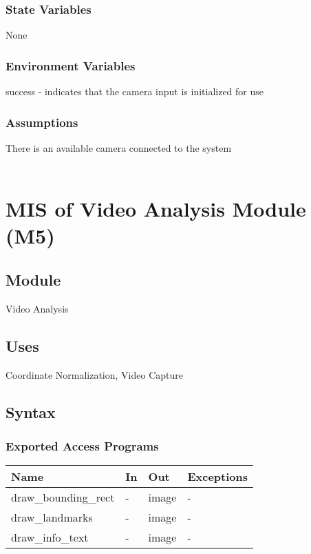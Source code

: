 \documentclass[12pt, titlepage]{article}
\begin{document}
\subsubsection{State Variables}

None\\

\subsubsection{Environment Variables}

success - indicates that the camera input is initialized for use\\

\subsubsection{Assumptions}

There is an available camera connected to the system\\

\newpage
~\newpage

\section{MIS of Video Analysis Module (M5)} \label{M5}

\subsection{Module}

Video Analysis\\

\subsection{Uses}

Coordinate Normalization, Video Capture\\

\subsection{Syntax}

\subsubsection{Exported Access Programs}

\begin{center}
\begin{tabular}{p{2cm} p{4cm} p{4cm} p{2cm}}
\hline
\textbf{Name} & \textbf{In} & \textbf{Out} & \textbf{Exceptions} \\
\hline
draw_bounding_rect & - & image & - \\
draw_landmarks & - & image & - \\
draw_info_text & - & image & - \\
\hline
\end{tabular}
\end{center}
\end{document}
